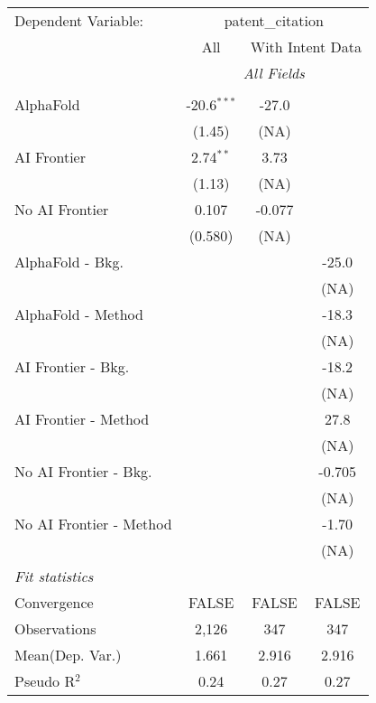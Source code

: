 \begingroup
\centering
\begin{tabular}{lccc}
   \tabularnewline \midrule \midrule
   Dependent Variable: & \multicolumn{3}{c}{patent\_citation}\\
 & \multicolumn{1}{c}{All} & \multicolumn{2}{c}{With Intent Data} \\
\cmidrule(lr){2-2} \cmidrule(lr){3-4}
 & \multicolumn{3}{c}{\textit{All Fields}} \\ \\
   AlphaFold               & -20.6$^{***}$ & -27.0  &   \\   
                           & (1.45)        & (NA)   &   \\   
   AI Frontier             & 2.74$^{**}$   & 3.73   &   \\   
                           & (1.13)        & (NA)   &   \\   
   No AI Frontier          & 0.107         & -0.077 &   \\   
                           & (0.580)       & (NA)   &   \\   
   AlphaFold - Bkg.        &               &        & -25.0\\   
                           &               &        & (NA)\\   
   AlphaFold - Method      &               &        & -18.3\\   
                           &               &        & (NA)\\   
   AI Frontier - Bkg.      &               &        & -18.2\\   
                           &               &        & (NA)\\   
   AI Frontier - Method    &               &        & 27.8\\   
                           &               &        & (NA)\\   
   No AI Frontier - Bkg.   &               &        & -0.705\\   
                           &               &        & (NA)\\   
   No AI Frontier - Method &               &        & -1.70\\   
                           &               &        & (NA)\\   
   \midrule
   \emph{Fit statistics}\\
   Convergence             &FALSE          & FALSE  & FALSE\\  
   Observations            & 2,126         & 347    & 347\\  
Mean(Dep. Var.) & 1.661 & 2.916 & 2.916 \\
   Pseudo R$^2$            & 0.24          & 0.27   & 0.27\\  
   

\end{tabular}
